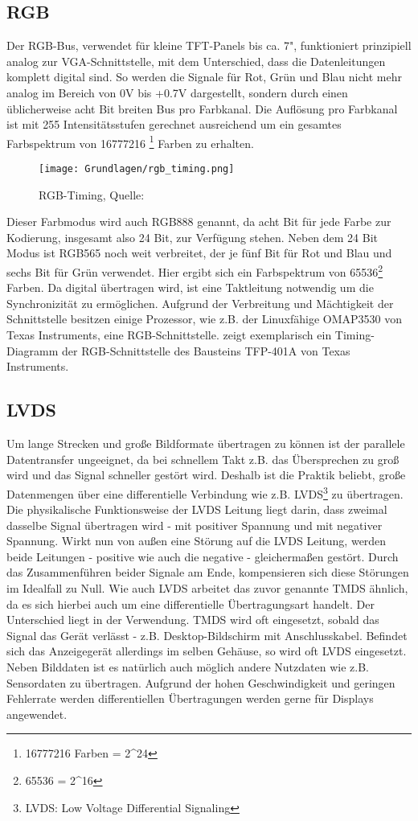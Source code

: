 \subsection{RGB}
Der RGB-Bus, verwendet für kleine TFT-Panels bis ca. 7", funktioniert prinzipiell analog zur VGA-Schnittstelle, mit dem Unterschied, dass die Datenleitungen komplett digital sind. 
So werden die Signale für Rot, Grün und Blau nicht mehr analog im Bereich von 0V bis +0.7V dargestellt, sondern durch einen üblicherweise acht Bit breiten Bus pro Farbkanal. Die Auflösung pro Farbkanal ist mit 255 Intensitätsstufen gerechnet ausreichend um ein gesamtes Farbspektrum von 16777216 \footnote{16777216 Farben = 2\textasciicircum24} Farben zu erhalten. 
\begin{figure}[htp]
	\centering
	\texttt{[image: Grundlagen/rgb\_timing.png]}
	\caption{RGB-Timing, Quelle: \cite{TI2011}}
	\label{fig:rgb_timing}
\end{figure}
Dieser Farbmodus wird auch RGB888 genannt, da acht Bit für jede Farbe zur Kodierung, insgesamt also 24 Bit, zur Verfügung stehen. Neben dem 24 Bit Modus ist RGB565 noch weit verbreitet, der je fünf Bit für Rot und Blau und sechs Bit für Grün verwendet. Hier ergibt sich ein Farbspektrum von 65536\footnote{65536 = 2\textasciicircum16} Farben. Da digital übertragen wird, ist eine Taktleitung notwendig um die Synchronizität zu ermöglichen. 
Aufgrund der Verbreitung und Mächtigkeit der Schnittstelle besitzen einige Prozessor, wie z.B. der Linuxfähige OMAP3530 von Texas Instruments, eine RGB-Schnittstelle. 
 zeigt exemplarisch ein Timing-Diagramm der RGB-Schnittstelle des Bausteins TFP-401A von Texas Instruments.
\subsection{LVDS}
Um lange Strecken und große Bildformate übertragen zu können ist der parallele Datentransfer ungeeignet, da bei schnellem Takt z.B. das Übersprechen zu groß wird und das Signal schneller gestört wird. Deshalb ist die Praktik beliebt, große Datenmengen über eine differentielle Verbindung wie z.B. LVDS\footnote{LVDS: Low Voltage Differential Signaling} zu übertragen. Die physikalische Funktionsweise der LVDS Leitung liegt darin, dass zweimal dasselbe Signal übertragen wird - mit positiver Spannung und mit negativer Spannung. Wirkt nun von außen eine Störung auf die LVDS Leitung, werden beide Leitungen - positive wie auch die negative - gleichermaßen gestört. Durch das Zusammenführen beider Signale am Ende, kompensieren sich diese Störungen im Idealfall zu Null. Wie auch LVDS arbeitet das zuvor genannte TMDS ähnlich, da es sich hierbei auch um eine differentielle Übertragungsart handelt. Der Unterschied liegt in der Verwendung. TMDS wird oft eingesetzt, sobald das Signal das Gerät verlässt - z.B. Desktop-Bildschirm mit Anschlusskabel. Befindet sich das Anzeigegerät allerdings im selben Gehäuse, so wird oft LVDS eingesetzt. Neben Bilddaten ist es natürlich auch möglich andere Nutzdaten wie z.B. Sensordaten zu übertragen. 
Aufgrund der hohen Geschwindigkeit und geringen Fehlerrate werden differentiellen Übertragungen werden gerne für Displays angewendet.
